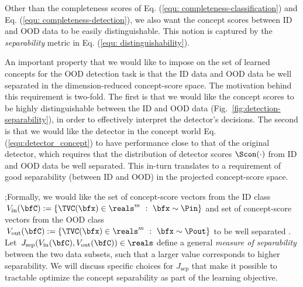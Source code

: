 
 Other than the completeness scores of Eq. (\ref{equ: completeness-classification}) and Eq. (\ref{equ: completeness-detection}), we also want the concept scores between ID and OOD data to be easily distinguishable. This notion is captured by the \textit{separability} metric in Eq. (\ref{equ: distinguishability}). 


An important property that we would like to impose on the set of learned concepts for the OOD detection task is that the ID data and OOD data be well separated in the dimension-reduced concept-score space.
The motivation behind this requirement is two-fold.
The first is that we would like the concept scores to be highly distinguishable between the ID and OOD data (\eg Fig.~\ref{fig:detection-separability}), in order to effectively interpret the detector's decisions.
The second is that we would like the detector in the concept world Eq. (\ref{equ:detector_concept}) to have performance close to that of the original detector, which requires that the distribution of detector scores $\Scon(\cdot)$ from ID and OOD data be well separated.
This in-turn translates to a requirement of good separability (between ID and OOD) in the projected concept-score space.
\fi

;Formally, we would like the set of concept-score vectors from the ID class $\,V_{\textrm{in}}(\bfC) := \{\TVC(\bfx) \in \reals^m ~:~ \bfx \sim \Pin\}$ and set of concept-score vectors from the OOD class $\,V_{\textrm{out}}(\bfC) := \{\TVC(\bfx) \in \reals^m ~:~ \bfx \sim \Pout\}$ to be well separated .
Let $\,J_{\textrm{sep}}(V_{\textrm{in}}(\bfC), V_{\textrm{out}}(\bfC)) \in \reals$ define a general {\it measure of separability} between the two data subsets, such that a larger value corresponds to higher separability.
We will discuss specific choices for $J_{\textrm{sep}}$ that make it possible to tractable optimize the concept separability as part of the learning objective.

